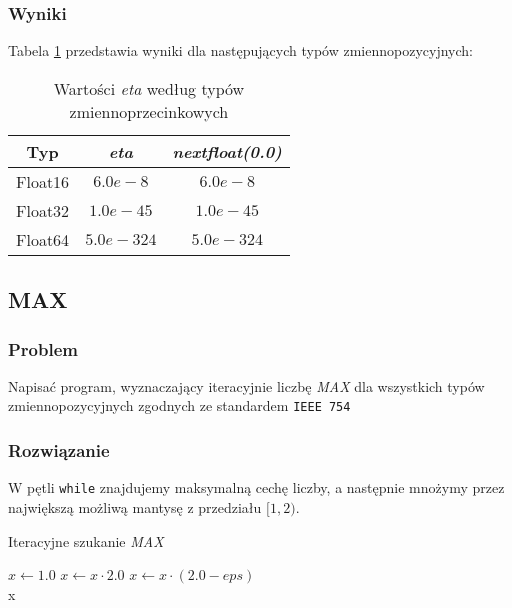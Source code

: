 \documentclass{article}
\begin{document}
    \subsubsection{Wyniki}
    Tabela \ref{table:eta} przedstawia wyniki dla następujących typów zmiennopozycyjnych:
        {\small
        \begin{table}[h!]
        \centering
        \begin{tabular}{c c c}
            \hline
             Typ & \textit{eta} & \textit{nextfloat(0.0)} \\
             \hline
             Float16 & $6.0e-8$ & $6.0e-8$ \\
             Float32 & $1.0e-45$ & $1.0e-45$\\
             Float64 & $5.0e-324$ & $5.0e-324$\\
             \hline
        \end{tabular}
        \caption{Wartości \textit{eta} według typów zmiennoprzecinkowych}
        \label{table:eta}
        \end{table}
        }
    
    \subsection{MAX}
    \subsubsection{Problem}
    Napisać program, wyznaczający iteracyjnie liczbę \textit{MAX} dla wszystkich typów zmiennopozycyjnych zgodnych ze standardem \texttt{IEEE 754}
    \subsubsection{Rozwiązanie}
    W pętli \texttt{while} znajdujemy maksymalną cechę liczby, a następnie mnożymy przez największą możliwą mantysę z przedziału $[1,2)$.
    \begin{algorithm}
        \caption{Iteracyjne szukanie \textit{MAX}}
        \begin{algorithmic}[1]
        \State $x\gets 1.0$
            \State $x\gets x \cdot 2.0$
        \EndWhile
        \State $x \gets x \cdot (2.0 - eps)$ \\
        \Return x
        \end{algorithmic}
    \end{algorithm}
\end{document}
